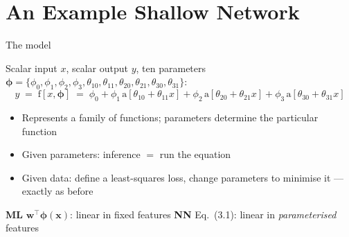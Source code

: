 \documentclass[aspectratio=169, 11pt]{beamer}
\newcommand{\mlparallel}[2]{%
  \vfill
  {\footnotesize
  \begin{tcolorbox}[enhanced, sidebyside, sidebyside align=top,
                    lefthand ratio=0.485,
                    segmentation style={mlc!35, line width=0.6pt},
                    colback=mlc!5, colframe=mlc!35, boxrule=0.5pt,
                    arc=1.5mm, left=2mm, right=2mm, top=0.8mm, bottom=0.8mm]
    {\color{mlc}\textbf{ML}}\;\; #1
  \tcblower
    {\color{nnc}\textbf{NN}}\;\; #2
  \end{tcolorbox}}%
  \vspace{0.6em}%
}
\newcommand{\src}[3]{}      %
\begin{document}
\section{An Example Shallow Network}

\begin{frame}{The model}
  \src{prince2023}{equation}{3.1}
  \src{prince2023}{section}{3.1}
  Scalar input $x$, scalar output $y$, ten parameters
  $\bm\phi = \{\phi_0,\phi_1,\phi_2,\phi_3,\theta_{10},
  \theta_{11},\theta_{20},\theta_{21},\theta_{30},\theta_{31}\}$:
  \[
    y \;=\; \mathrm{f}[x,\bm\phi]
    \;=\; \phi_0+\phi_1\,\mathrm{a}[\theta_{10}+\theta_{11}x]
    +\phi_2\,\mathrm{a}[\theta_{20}+\theta_{21}x]
    +\phi_3\,\mathrm{a}[\theta_{30}+\theta_{31}x]
    \tag{P 3.1}
  \]
  \vspace{-0.2em}
  \begin{itemize}\setlength{\itemsep}{1pt}
    \item Represents a \alert{family of functions};
          parameters determine the particular function
    \item Given parameters: inference $=$ run the equation
    \item Given data: define a least-squares loss, change
          parameters to minimise it --- exactly as before
  \end{itemize}
  \mlparallel{$\mathbf{w}^{\!\top}\boldsymbol{\phi}(\mathbf{x})$:
              linear in fixed features}
             {Eq.~(3.1): linear in \emph{parameterised}
              features}
\end{frame}
\end{document}
